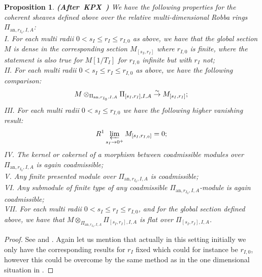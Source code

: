 \documentclass[12pt]{amsart}
\newtheorem{proposition}[theorem]{Proposition}
\theoremstyle{definition}
\numberwithin{equation}{section}
\begin{document}
\begin{proposition} \mbox{\bf{(After KPX \cite[Lemma 2.1.4]{KPX})}} \label{prop2.9}
We have the following properties for the coherent sheaves defined above over the relative multi-dimensional Robba rings $\Pi_{\mathrm{an},r_{I_0},I,A}$:\\
I.	For each multi radii $0< s_I\leq r_I\leq r_{I,0}$ as above, we have that the global section $M$ is dense in the corresponding section $M_{[s_I,r_I]}$ where $r_{I,0}$ is finite, where the statement is also true for $M[1/T_I]$ for $r_{I,0}$ infinite but with $r_I$ not;\\
II. For each multi radii $0< s_I\leq r_I\leq r_{I,0}$ as above, we have the following comparison:
\begin{displaymath}
M\otimes_{\Pi_{\mathrm{an},r_{I_0},I,A}}\Pi_{[s_I,r_I],I,A}\overset{\sim}{\rightarrow}	M_{[s_I,r_I]};\\
\end{displaymath}
III. For each multi radii $0< s_I \leq r_{I,0}$ we have the following higher vanishing result:
\begin{displaymath}
R^1\varprojlim_{s_I\rightarrow 0^+}M_{[s_I,r_{I,0}]}=0;\\	
\end{displaymath}
IV. The kernel or cokernel of a morphism between coadmissible modules over $\Pi_{\mathrm{an},r_{I_0},I,A}$ is again coadmissible;\\
V. Any finite presented module over $\Pi_{\mathrm{an},r_{I_0},I,A}$ is coadmissible;\\
VI. Any submodule of finite type of any coadmissible  $\Pi_{\mathrm{an},r_{I_0},I,A}$-module is again coadmissible;\\ 
VII. For each multi radii $0< s_I\leq r_I\leq r_{I,0} $, and for the global section defined above, we have that $M\otimes_{\Pi_{\mathrm{an},r_{I_0},I,A}}\Pi_{[s_I,r_I],I,A}$ is flat over $\Pi_{[s_I,r_I],I,A}$. 

\end{proposition}



\begin{proof}
See \cite[Lemma 2.1.4]{KPX} and \cite{ST1}. Again let us mention that actually in this setting initially we only have the corresponding results for $r_I$ fixed which could for instance be $r_{I,0}$, however this could be overcome by the same method as in the one dimensional situation in \cite[Lemma 2.1.4]{KPX}.
\end{proof}
\end{document}

